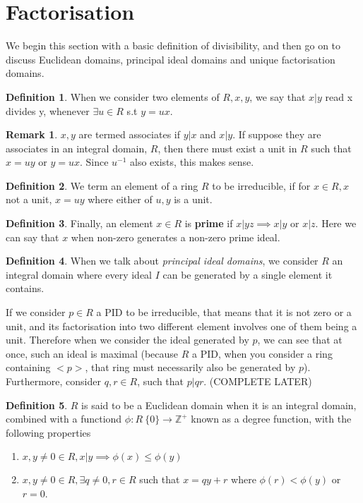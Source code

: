 \documentclass[12pt]{book}
\theoremstyle{definition}
\newtheorem*{definition}{Definition}
\newtheorem*{remark}{Remark}
\begin{document}
\section{Factorisation}
We begin this section with a basic definition of divisibility, and then go on to discuss Euclidean domains, principal ideal domains and unique factorisation domains.
\begin{definition}
    When we consider two elements of $R, x, y$, we say that $x | y$ read x divides y, whenever $\exists u \in R$ s.t $y = ux$.
\end{definition}
\begin{remark}
    $x,y$ are termed associates if $y|x$ and $x|y$.
    If suppose they are associates in an integral domain, $R$, then there must exist a unit in $R$ such that $x = uy$ or $y = ux$. Since $u^{-1}$ also exists, this makes sense.
\end{remark}
\begin{definition}
    We term an element of a ring $R$ to be irreducible, if for $x \in R, x$ not a unit, $x = uy$ where either of $u,y$ is a unit.
\end{definition}
\begin{definition}
    Finally, an element $x \in R$ is \textbf{prime} if $x | yz \implies x|y $ or $x | z$. Here we can say that $x$ when non-zero generates a non-zero prime ideal.
\end{definition}
\begin{definition}
    When we talk about \textit{principal ideal domains}, we consider $R$ an integral domain where every ideal $I$ can be generated by a single element it contains. 
\end{definition}
If we consider $p \in R$ a PID to be irreducible, that means that it is not zero or a unit, and its factorisation into two different element involves one of them being a unit. Therefore when we consider the ideal generated by $p$, we can see that at once, such an ideal is maximal (because $R$ a PID, when you consider a ring containing $<p>$, that ring must necessarily also be generated by $p$). Furthermore, consider $q, r \in R$, such that $p | qr$. (COMPLETE LATER)
\begin{definition}
    $R$ is said to be a Euclidean domain when it is an integral domain, combined with a functiond $\phi: R\ \{0\} \to \mathbb{Z}^+$ known as a degree function, with the following properties \begin{enumerate}
        \item $x, y \neq 0 \in R, x | y \implies \phi(x) \leq \phi(y)$
        \item $x, y \neq 0 \in R, \exists q \neq 0, r \in R$ such that $x = qy + r$ where $\phi(r) < \phi(y)$ or $r = 0$.
    \end{enumerate}
\end{definition}
\end{document}
